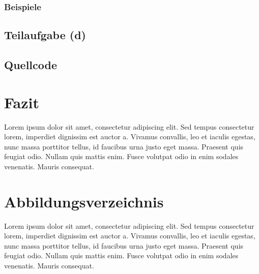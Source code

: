 \documentclass[a4paper,12pt]{article}			%
\begin{document}
\subsubsection{Beispiele}

\subsection{Teilaufgabe (d)}

\subsection{Quellcode}


\newpage
\section{Fazit}



Lorem ipsum dolor sit amet, consectetur adipiscing elit. Sed tempus consectetur lorem, imperdiet dignissim est auctor a. Vivamus convallis, leo et iaculis egestas, nunc massa porttitor tellus, id faucibus urna justo eget massa. Praesent quis feugiat odio. Nullam quis mattis enim. Fusce volutpat odio in enim sodales venenatis. Mauris consequat.


\newpage
\section{Abbildungsverzeichnis}



Lorem ipsum dolor sit amet, consectetur adipiscing elit. Sed tempus consectetur lorem, imperdiet dignissim est auctor a. Vivamus convallis, leo et iaculis egestas, nunc massa porttitor tellus, id faucibus urna justo eget massa. Praesent quis feugiat odio. Nullam quis mattis enim. Fusce volutpat odio in enim sodales venenatis. Mauris consequat.

\end{document}
